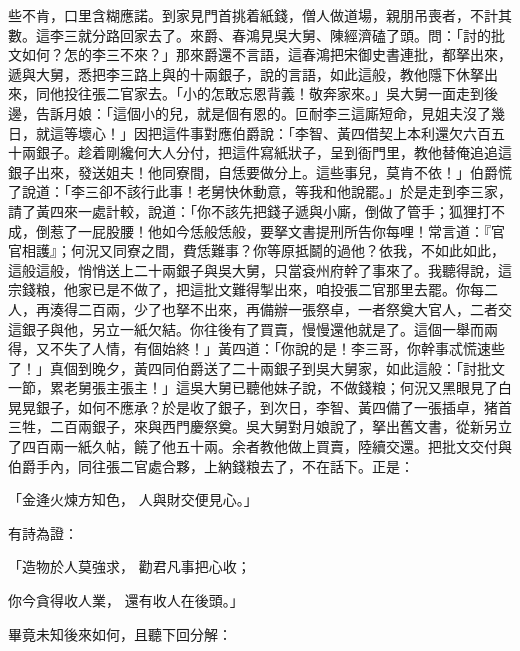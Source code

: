 \begin{showcontents}{}
些不肯，口里含糊應諾。到家見門首挑着紙錢，僧人做道場，親朋吊喪者，不計其數。這李三就分路回家去了。來爵、春鴻見吳大舅、陳經濟磕了頭。問：「討的批文如何？怎的李三不來？」那來爵還不言語，這春鴻把宋御史書連批，都拏出來，遞與大舅，悉把李三路上與的十兩銀子，說的言語，如此這般，教他隱下休拏出來，同他投往張二官家去。「小的怎敢忘恩背義！敬奔家來。」吳大舅一面走到後邊，告訴月娘：「這個小的兒，就是個有恩的。叵耐李三這廝短命，見姐夫沒了幾日，就這等壞心！」因把這件事對應伯爵說：「李智、黃四借契上本利還欠六百五十兩銀子。趁着剛纔何大人分付，把這件寫紙狀子，呈到衙門里，教他替俺追追這銀子出來，發送姐夫！他同寮間，自恁要做分上。這些事兒，莫肯不依！」伯爵慌了說道：「李三卻不該行此事！老舅快休動意，等我和他說罷。」於是走到李三家，請了黃四來一處計較，說道：「你不該先把錢子遞與小廝，倒做了管手；狐狸打不成，倒惹了一屁股腰！他如今恁般恁般，要拏文書提刑所告你每哩！常言道：『官官相護』；何況又同寮之間，費恁難事？你等原抵鬬的過他？依我，不如此如此，這般這般，悄悄送上二十兩銀子與吳大舅，只當袞州府幹了事來了。我聽得說，這宗錢粮，他家已是不做了，把這批文難得掣出來，咱投張二官那里去罷。你每二人，再湊得二百兩，少了也拏不出來，再備辦一張祭卓，一者祭奠大官人，二者交這銀子與他，另立一紙欠結。你往後有了買賣，慢慢還他就是了。這個一舉而兩得，又不失了人情，有個始終！」黃四道：「你說的是！李三哥，你幹事忒慌速些了！」真個到晚夕，黃四同伯爵送了二十兩銀子到吳大舅家，如此這般：「討批文一節，累老舅張主張主！」這吳大舅已聽他妹子說，不做錢粮；何況又黑眼見了白晃晃銀子，如何不應承？於是收了銀子，到次日，李智、黃四備了一張插卓，猪首三牲，二百兩銀子，來與西門慶祭奠。吳大舅對月娘說了，拏出舊文書，從新另立了四百兩一紙久帖，饒了他五十兩。余者教他做上買賣，陸續交還。把批文交付與伯爵手內，同往張二官處合夥，上納錢粮去了，不在話下。正是：

「金逄火煉方知色，  人與財交便見心。」

有詩為證：

「造物於人莫強求，  勸君凡事把心收；

你今貪得收人業，  還有收人在後頭。」

畢竟未知後來如何，且聽下回分解：





\end{showcontents}


